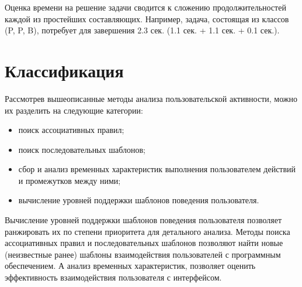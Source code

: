 Оценка времени на решение задачи сводится к сложению продолжительностей каждой из простейших составляющих. Например, задача, состоящая из классов (P, P, B), потребует для завершения 2.3 сек. (1.1 сек. + 1.1 сек. + 0.1 сек.).


\section{Классификация}
Рассмотрев вышеописанные методы анализа пользовательской активности, можно их разделить на следующие категории:
\begin{itemize}
	\item поиск ассоциативных правил;
	\item поиск последовательных шаблонов;
	\item сбор и анализ временных характеристик выполнения пользователем действий и промежутков между ними;
	\item вычисление уровней поддержки шаблонов поведения пользователя.
\end{itemize}

Вычисление уровней поддержки шаблонов поведения пользователя позволяет ранжировать их по степени приоритета для детального анализа.
Методы поиска ассоциативных правил и последовательных шаблонов позволяют найти новые (неизвестные ранее) шаблоны взаимодействия пользователей с программным обеспечением.
А анализ временных характеристик, позволяет оценить эффективность взаимодействия пользователя с интерфейсом.